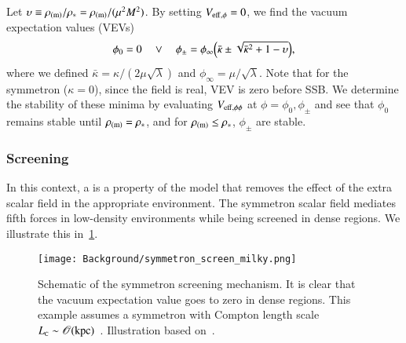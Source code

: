     Let $\upsilon\equiv\rho_\mathrm{(m)}/\rho_\ast = \rho_\mathrm{(m)}/(\mu^2M^2)$. By setting $V_\mathrm{eff,\phi}=0$, we find the vacuum expectation values (VEVs)
    \begin{equation}
        \phi_0 = 0 \quad \lor \quad \phi_\pm = \phi_\infty \pclosed{\bar{\kappa} \pm  \sqrt{\bar{\kappa}^2 +  1- \upsilon }},%
    \end{equation}
    where we defined $\bar{\kappa} = \kappa / (2\mu \sqrt{\lambda}) $ and $\phi_\infty = \mu/\sqrt{\lambda}$. Note that for the symmetron ($\kappa=0$), since the field is real, VEV is zero before SSB. 
    We determine the stability of these minima by evaluating $V_\mathrm{eff,\phi\phi}$ at $\phi=\phi_0,\phi_\pm$ and see that $\phi_0$ remains stable until $\rho_\mathrm{(m)}=\rho_\ast$, and for $\rho_\mathrm{(m)}\leq \rho_\ast$, $\phi_\pm$ are stable. %


    \subsubsection{Screening}
    In this context, a  is a property of the model that removes the effect of the extra scalar field in the appropriate environment. The symmetron scalar field mediates fifth forces in low-density environments while being screened in dense regions. We illustrate this in~\cref{fig:cosmo:quintessence:symmetron_screen_milky}. 

    \begin{figure}[h]
        \centering
        {\texttt{[image: Background/symmetron\_screen\_milky.png]}}
        {\caption{Schematic of the symmetron screening mechanism. It is clear that the vacuum expectation value goes to zero in dense regions. This example assumes a symmetron with Compton length scale $L_{\text{\tiny{C}}}\sim\mathscr{O}(\mathrm{kpc})$~\citep{burrageAccurateComputationScreening2024}. Illustration based on~\citet{christiansenCosmologicalSimulationsPhase2024}.}
        \label{fig:cosmo:quintessence:symmetron_screen_milky}}
    \end{figure}


